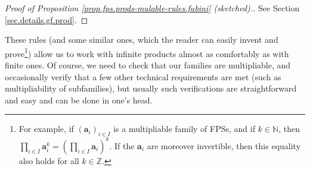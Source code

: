 \begin{proof}
[Proof of Proposition \ref{prop.fps.prods-mulable-rules.fubini} (sketched).]%
See Section \ref{sec.details.gf.prod}.
\end{proof}

These rules (and some similar ones, which the reader can easily invent and
prove\footnote{For example, if $\left(  \mathbf{a}_{i}\right)  _{i\in I}$ is a
multipliable family of FPSs, and if $k\in\mathbb{N}$, then $\prod_{i\in
I}\mathbf{a}_{i}^{k}=\left(  \prod_{i\in I}\mathbf{a}_{i}\right)  ^{k}$. If
the $\mathbf{a}_{i}$ are moreover invertible, then this equality also holds
for all $k\in\mathbb{Z}$.}) allow us to work with infinite products almost as
comfortably as with finite ones. Of course, we need to check that our families
are multipliable, and occasionally verify that a few other technical
requirements are met (such as multipliability of subfamilies), but usually
such verifications are straightforward and easy and can be done in one's head.

